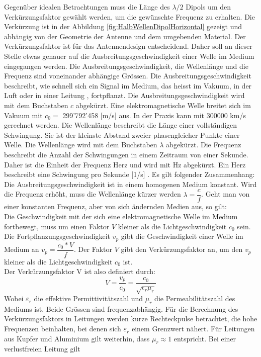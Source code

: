 \newpage
Gegenüber idealen Betrachtungen muss die Länge des $\lambda /2$ Dipols um den Verkürzungsfaktor gewählt werden, um  die gewünschte Frequenz zu erhalten. Die Verkürzung  ist in der Abbildung \ref{fig:HalbWellenDipolHorizontal} gezeigt und abhängig von der Geometrie der Antenne und dem umgebenden Material\cite{Hcuno}.
Der Verkürzungsfaktor ist für das Antennendesign entscheidend. Daher soll an dieser Stelle etwas genauer auf die Ausbreitungsgeschwindigkeit einer Welle im Medium eingegangen werden.
Die Ausbreitungsgeschwindigkeit, die Wellenlänge und die Frequenz sind voneinander abhängige Grössen. 
Die Ausbreitungsgeschwindigkeit beschreibt, wie schnell sich ein Signal im Medium, das heisst im Vakuum, in der Luft oder in einer Leitung , fortpflanzt. Die Ausbreitungsgeschwindigkeit wird mit dem Buchstaben $c$ abgekürzt. Eine elektromagnetische Welle breitet sich im
Vakuum mit $c_0 = $ 299'792’458 [m/s] aus. In der Praxis kann mit 300000 km/s gerechnet werden.
Die Wellenlänge beschreibt die Länge einer vollständigen Schwingung. Sie ist der kleinste Abstand zweier phasengleicher Punkte einer Welle. Die Wellenlänge wird mit dem Buchstaben $\lambda$  abgekürzt. Die Frequenz beschreibt  die Anzahl der Schwingungen in einem  Zeitraum von einer Sekunde. Daher ist die Einheit der Frequenz Herz und wird mit Hz abgekürzt. Ein Herz  beschreibt eine Schwingung pro Sekunde [1/s] \cite{Verkuertzungsfaktor}.
Es gilt folgender Zusammenhang:\\
Die Ausbreitungsgeschwindigkeit ist in einem homogenen Medium konstant. Wird die Frequenz erhöht, muss  die Wellenlänge kürzer werden $\lambda = \dfrac{c}{f}$. Geht man von einer konstanten Frequenz, aber von sich ändernden Medien aus, so gilt: \\
Die Geschwindigkeit mit der sich eine elektromagnetische Welle im Medium fortbewegt, muss um einen Faktor $V$ kleiner  als die Lichtgeschwindigkeit $c_0$ sein.\\
Die Fortpflanzungsgeschwindigkeit $v_p$ gibt die Geschwindigkeit einer Welle im Medium an  $v_p=\dfrac{c_0*V}{f} $. Der Faktor $V$ gibt den Verkürzungsfaktor an, um den $v_p$ kleiner als die Lichtgeschwindigkeit $c_0$ ist. \\
Der Verkürzungsfaktor V ist also definiert durch:
\begin{equation}
V=\dfrac{v_p}{c_0}=\dfrac{c_0}{\sqrt{\epsilon_r \mu_r}}
\end{equation}
Wobei $\varepsilon_r$ die effektive Permittivitätszahl
 und $\mu_r$ die Permeabilitätszahl des Mediums ist. Beide Grössen sind  frequenzabhängig. Für die Berechnung des Verkürzungsfaktors in Leitungen werden kurze Rechteckpulse betrachtet, die hohe Frequenzen beinhalten, bei denen sich $\varepsilon_r$ einem Grenzwert nähert. Für Leitungen aus Kupfer und Aluminium gilt weiterhin, dass $\mu_r \approx 1$ entspricht. Bei einer verlustfreien Leitung gilt\cite{Verkuertzungsfaktor_wiki}
